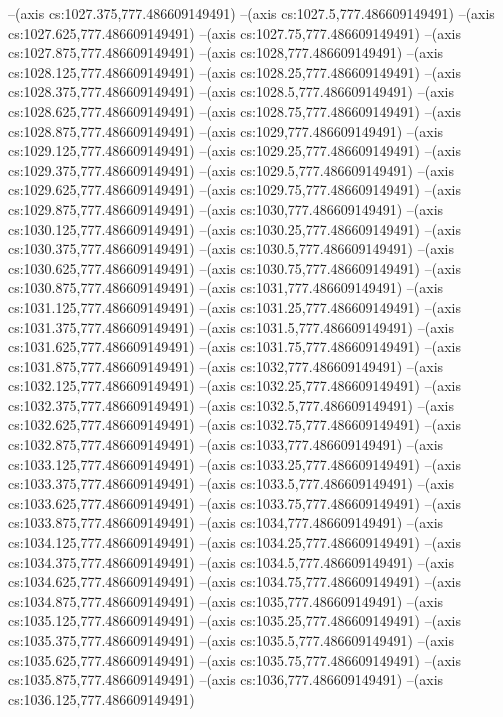 --(axis cs:1027.375,777.486609149491)
--(axis cs:1027.5,777.486609149491)
--(axis cs:1027.625,777.486609149491)
--(axis cs:1027.75,777.486609149491)
--(axis cs:1027.875,777.486609149491)
--(axis cs:1028,777.486609149491)
--(axis cs:1028.125,777.486609149491)
--(axis cs:1028.25,777.486609149491)
--(axis cs:1028.375,777.486609149491)
--(axis cs:1028.5,777.486609149491)
--(axis cs:1028.625,777.486609149491)
--(axis cs:1028.75,777.486609149491)
--(axis cs:1028.875,777.486609149491)
--(axis cs:1029,777.486609149491)
--(axis cs:1029.125,777.486609149491)
--(axis cs:1029.25,777.486609149491)
--(axis cs:1029.375,777.486609149491)
--(axis cs:1029.5,777.486609149491)
--(axis cs:1029.625,777.486609149491)
--(axis cs:1029.75,777.486609149491)
--(axis cs:1029.875,777.486609149491)
--(axis cs:1030,777.486609149491)
--(axis cs:1030.125,777.486609149491)
--(axis cs:1030.25,777.486609149491)
--(axis cs:1030.375,777.486609149491)
--(axis cs:1030.5,777.486609149491)
--(axis cs:1030.625,777.486609149491)
--(axis cs:1030.75,777.486609149491)
--(axis cs:1030.875,777.486609149491)
--(axis cs:1031,777.486609149491)
--(axis cs:1031.125,777.486609149491)
--(axis cs:1031.25,777.486609149491)
--(axis cs:1031.375,777.486609149491)
--(axis cs:1031.5,777.486609149491)
--(axis cs:1031.625,777.486609149491)
--(axis cs:1031.75,777.486609149491)
--(axis cs:1031.875,777.486609149491)
--(axis cs:1032,777.486609149491)
--(axis cs:1032.125,777.486609149491)
--(axis cs:1032.25,777.486609149491)
--(axis cs:1032.375,777.486609149491)
--(axis cs:1032.5,777.486609149491)
--(axis cs:1032.625,777.486609149491)
--(axis cs:1032.75,777.486609149491)
--(axis cs:1032.875,777.486609149491)
--(axis cs:1033,777.486609149491)
--(axis cs:1033.125,777.486609149491)
--(axis cs:1033.25,777.486609149491)
--(axis cs:1033.375,777.486609149491)
--(axis cs:1033.5,777.486609149491)
--(axis cs:1033.625,777.486609149491)
--(axis cs:1033.75,777.486609149491)
--(axis cs:1033.875,777.486609149491)
--(axis cs:1034,777.486609149491)
--(axis cs:1034.125,777.486609149491)
--(axis cs:1034.25,777.486609149491)
--(axis cs:1034.375,777.486609149491)
--(axis cs:1034.5,777.486609149491)
--(axis cs:1034.625,777.486609149491)
--(axis cs:1034.75,777.486609149491)
--(axis cs:1034.875,777.486609149491)
--(axis cs:1035,777.486609149491)
--(axis cs:1035.125,777.486609149491)
--(axis cs:1035.25,777.486609149491)
--(axis cs:1035.375,777.486609149491)
--(axis cs:1035.5,777.486609149491)
--(axis cs:1035.625,777.486609149491)
--(axis cs:1035.75,777.486609149491)
--(axis cs:1035.875,777.486609149491)
--(axis cs:1036,777.486609149491)
--(axis cs:1036.125,777.486609149491)

